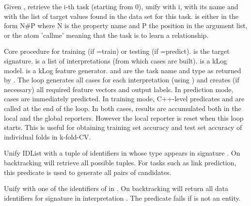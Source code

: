 \begin{description}
Given , retrieve the i-th task (starting from 0),
unify  with i,  with its name and  with the
list of target values found in the data set for this task. 
is either in the form N\#P where N is the property name and P the
position in the argument list, or the atom 'callme' meaning that the
task is to learn a relationship.

Core procedure for training (if =train) or testing (if
=predict).  is the target signature.  is a list of
interpretations (from which cases are built).  is a kLog
model.  is a kLog feature generator.  and  are the task
name and type as returned by . The loop generates all
cases for each interpretation (using ) and
creates (if necessary) all required feature vectors and output
labels. In prediction mode, cases are immediately predicted. In
training mode, C++-level predicates  and 
are called at the end of the loop. In both cases, results are
accumulated both in the local and the global reporters. However the
local reporter is reset when this loop starts. This is useful for
obtaining training set accuracy and test set accuracy of individual
folds in k-fold-CV.

Unify IDList with a tuple of identifiers in  whose type appears in
signature . On backtracking will retrieve all possible tuples. For
tasks such as link prediction, this predicate is used to generate
all pairs of candidates.

Unify  with one of the identifiers of  in . On backtracking
will return all data identifiers for signature  in interpretation
. The predicate fails if  is not an entity.



\end{description}
